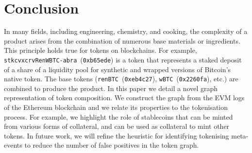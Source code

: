 \section{Conclusion}\label{sec:conclusion}

In many fields, including engineering, chemistry, and cooking, the
complexity of a product arises from the combination of numerous base
materials or ingredients.  This principle holds true for tokens on
blockchains.  For example,
\texttt{stkcvxcrvRenWBTC-abra}~(\texttt{0xb65ede}) is a token that
represents a staked deposit of a share of a liquidity pool for
synthetic and wrapped versions of Bitcoin's native token.  The base
tokens (\texttt{renBTC}~(\texttt{0xeb4c27}),
\texttt{wBTC}~(\texttt{0x2260fa}), etc.) are combined to produce the
product.  In this paper we detail a novel graph representation of
token composition.  We construct the graph from the EVM logs of the
Ethereum blockchain and we relate its properties to the tokenisation
process.  For example, we highlight the role of stablecoins that can
be minted from various forms of collateral, and can be used as
collateral to mint other tokens.  In future work, we will refine the
heuristic for identifying tokenising meta-events to reduce the number
of false positives in the token graph.
